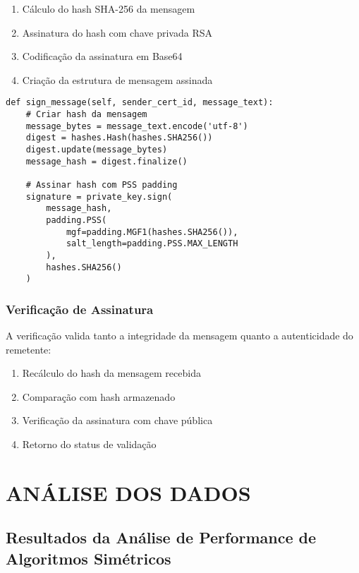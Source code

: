 \documentclass[12pt,a4paper,oneside]{article}
\begin{document}
\begin{enumerate}
    \item Cálculo do hash SHA-256 da mensagem
    \item Assinatura do hash com chave privada RSA
    \item Codificação da assinatura em Base64
    \item Criação da estrutura de mensagem assinada
\end{enumerate}

\begin{lstlisting}[caption=Implementação da assinatura digital]
def sign_message(self, sender_cert_id, message_text):
    # Criar hash da mensagem
    message_bytes = message_text.encode('utf-8')
    digest = hashes.Hash(hashes.SHA256())
    digest.update(message_bytes)
    message_hash = digest.finalize()
    
    # Assinar hash com PSS padding
    signature = private_key.sign(
        message_hash,
        padding.PSS(
            mgf=padding.MGF1(hashes.SHA256()),
            salt_length=padding.PSS.MAX_LENGTH
        ),
        hashes.SHA256()
    )
\end{lstlisting}

\subsubsection{Verificação de Assinatura}

A verificação valida tanto a integridade da mensagem quanto a autenticidade do remetente:

\begin{enumerate}
    \item Recálculo do hash da mensagem recebida
    \item Comparação com hash armazenado
    \item Verificação da assinatura com chave pública
    \item Retorno do status de validação
\end{enumerate}

\section{ANÁLISE DOS DADOS}

\subsection{Resultados da Análise de Performance de Algoritmos Simétricos}
\end{document}
